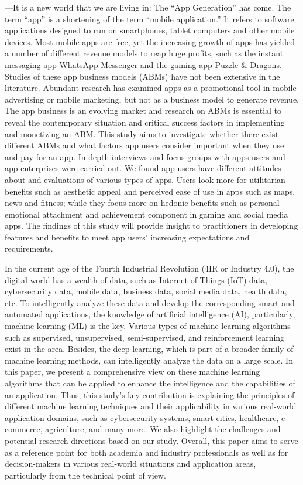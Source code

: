 \documentclass{article}
\begin{document}
\medskip
—It is a new world that we are living in: The “App
Generation” has come. The term “app” is a shortening of the
term “mobile application.” It refers to software applications
designed to run on smartphones, tablet computers and other
mobile devices. Most mobile apps are free, yet the increasing
growth of apps has yielded a number of different revenue
models to reap huge profits, such as the instant messaging app
WhatsApp Messenger and the gaming app Puzzle \& Dragons.
Studies of these app business models (ABMs) have not been
extensive in the literature. Abundant research has examined
apps as a promotional tool in mobile advertising or mobile
marketing, but not as a business model to generate revenue.
The app business is an evolving market and research on ABMs
is essential to reveal the contemporary situation and critical
success factors in implementing and monetizing an ABM. This
study aims to investigate whether there exist different ABMs
and what factors app users consider important when they use
and pay for an app. In-depth interviews and focus groups with
apps users and app enterprises were carried out. We found app
users have different attitudes about and evaluations of various
types of apps. Users look more for utilitarian benefits such as
aesthetic appeal and perceived ease of use in apps such as maps,
news and fitness; while they focus more on hedonic benefits
such as personal emotional attachment and achievement
component in gaming and social media apps. The findings of
this study will provide insight to practitioners in developing
features and benefits to meet app users’ increasing
expectations and requirements. \cite{tang2016mobile}

\medskip
In the current age of the Fourth Industrial Revolution (4IR or Industry 4.0), the digital world has a wealth of data, such as Internet of Things (IoT) data, cybersecurity data, mobile data, business data, social media data, health data, etc. To intelligently analyze these data and develop the corresponding smart and automated applications, the knowledge of artificial intelligence (AI), particularly, machine learning (ML) is the key. Various types of machine learning algorithms such as supervised, unsupervised, semi-supervised, and reinforcement learning exist in the area. Besides, the deep learning, which is part of a broader family of machine learning methods, can intelligently analyze the data on a large scale. In this paper, we present a comprehensive view on these machine learning algorithms that can be applied to enhance the intelligence and the capabilities of an application. Thus, this study’s key contribution is explaining the principles of different machine learning techniques and their applicability in various real-world application domains, such as cybersecurity systems, smart cities, healthcare, e-commerce, agriculture, and many more. We also highlight the challenges and potential research directions based on our study. Overall, this paper aims to serve as a reference point for both academia and industry professionals as well as for decision-makers in various real-world situations and application areas, particularly from the technical point of view. \cite{sarker2021machine}
\end{document}
